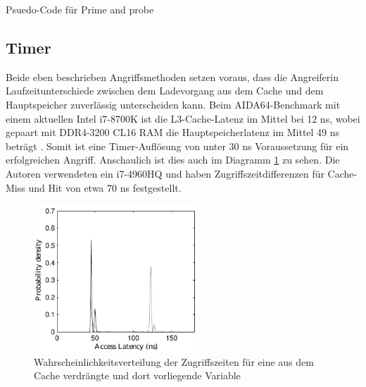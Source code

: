 \begin{algorithm}[h]
\DontPrintSemicolon
\caption{Psuedo-Code für Prime and probe}
\label{alg:prime_and_pribe}


\end{algorithm}



\newtext

\subsection{Timer}

Beide eben beschrieben Angriffsmethoden setzen voraus, dass die Angreiferin Laufzeitunterschiede zwischen dem Ladevorgang aus dem Cache und dem Hauptspeicher zuverlässig unterscheiden kann. Beim AIDA64-Benchmark mit einem aktuellen Intel i7-8700K ist die L3-Cache-Latenz im Mittel bei 12 ns, wobei gepaart mit DDR4-3200 CL16 RAM die Hauptspeicherlatenz im Mittel 49 ns beträgt \cite{i78700kLatency}. Somit ist eine Timer-Auflösung von unter 30 ns Voraussetzung für ein erfolgreichen Angriff. Anschaulich ist dies auch im Diagramm \ref{fig:RAMCacheLatency} zu sehen. Die Autoren verwendeten ein i7-4960HQ und haben Zugriffszeitdifferenzen für Cache-Miss und Hit von etwa 70 ns festgestellt. 

\begin{figure}[h]
\label{fig:RAMCacheLatency}
\centering
\includegraphics[width=0.55\textwidth]{basics/i7-4790HQ_latency_plot.pdf}
\caption{Wahrscheinlichkeitsverteilung der Zugriffszeiten für eine aus dem Cache verdrängte und dort vorliegende Variable \cite{TheSpyInTheSandbox}}
\end{figure}

